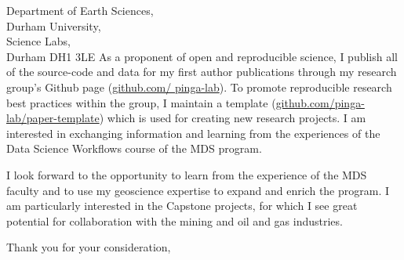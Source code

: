 \documentclass[11pt]{letter}
\begin{document}
\begin{letter}{
        Department of Earth Sciences,  \\
        Durham University, \\
        Science Labs, \\
        Durham DH1 3LE
}
As a proponent of open and reproducible science, I publish all of the
source-code and data for my first author publications through my research
group's Github page
(\href{https://github.com/pinga-lab}{github.com/ pinga-lab}).
To promote reproducible research best practices within the group,
I maintain a template
(\href{https://github.com/pinga-lab/paper-template}{github.com/pinga-lab/paper-template})
which is used for creating new research projects.
I am interested in exchanging information and learning from the experiences of
the Data Science Workflows course of the MDS program.


I look forward to the opportunity to learn from the experience of the MDS
faculty and to use my geoscience expertise to expand and enrich the program.
I am particularly interested in the Capstone projects, for which I see great
potential for collaboration with the mining and oil and gas industries.

\closing{Thank you for your consideration,}


\end{letter}
\end{document}
